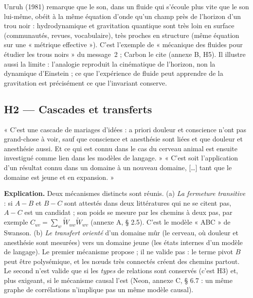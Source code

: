 \documentclass[a4paper,11pt]{article}
\begin{document}
\begin{exemple}
Unruh (1981) remarque que le son, dans un fluide qui s'écoule plus vite que le son lui-même, obéit à la même équation d'onde qu'un champ près de l'horizon d'un trou noir : hydrodynamique et gravitation quantique sont très loin en surface (communautés, revues, vocabulaire), très proches en structure (même équation sur une « métrique effective »). C'est l'exemple de « mécanique des fluides pour étudier les trous noirs » du message~2 ; Carbon le cite (annexe B, H5). Il illustre aussi la limite : l'analogie reproduit la cinématique de l'horizon, non la dynamique d'Einstein ; ce que l'expérience de fluide peut apprendre de la gravitation est précisément ce que l'invariant conserve.
\end{exemple}

\subsection{H2 — Cascades et transferts}
\begin{enonce}
« C'est une cascade de mariages d'idées : a priori douleur et conscience n'ont pas grand-chose à voir, sauf que conscience et anesthésie sont liées et que douleur et anesthésie aussi. Et ce qui est connu dans le cas du cerveau animal est ensuite investigué comme lien dans les modèles de langage. » « C'est soit l'application d'un résultat connu dans un domaine à un nouveau domaine, […] tant que le domaine est jeune et en expansion. »
\end{enonce}

\textbf{Explication.} Deux mécanismes distincts sont réunis. (a) \emph{La fermeture transitive} : si $A\!-\!B$ et $B\!-\!C$ sont attestés dans deux littératures qui ne se citent pas, $A\!-\!C$ est un candidat ; son poids se mesure par les chemins à deux pas, par exemple $C_{uv}=\sum_w \tilde W_{uw}\tilde W_{wv}$ (annexe A, § 2.5). C'est le modèle « ABC » de Swanson. (b) \emph{Le transfert orienté} d'un domaine mûr (le cerveau, où douleur et anesthésie sont mesurées) vers un domaine jeune (les états internes d'un modèle de langage). Le premier mécanisme propose ; il ne valide pas : le terme pivot $B$ peut être polysémique, et les nœuds très connectés créent des chemins partout. Le second n'est valide que si les \emph{types} de relations sont conservés (c'est H3) et, plus exigeant, si le mécanisme causal l'est (Neon, annexe C, § 6.7 : un même graphe de corrélations n'implique pas un même modèle causal).
\end{document}

